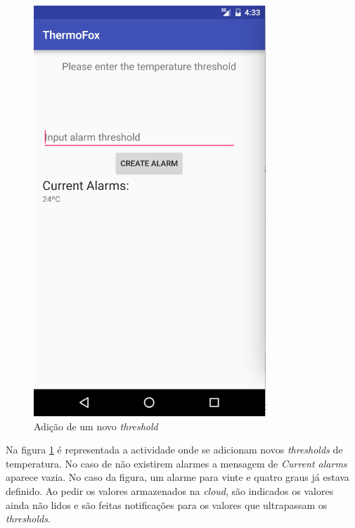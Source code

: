 \documentclass[a4paper]{article}
\begin{document}
\begin{figure}[H]
  \includegraphics[width=\linewidth]{addAlarm.png}
  \caption{Adição de um novo \textit{threshold}}\label{fig:addAlarm}
\endminipage
\end{figure}

Na figura \ref{fig:addAlarm} é representada a actividade onde se adicionam novos \textit{thresholds} de temperatura. No caso de não existirem alarmes a mensagem de \textit{Current alarms} aparece vazia. No caso da figura, um alarme para vinte e quatro graus já estava definido. Ao pedir os valores armazenados na \textit{cloud}, são indicados os valores ainda não lidos e são feitas notificações para os valores que ultrapassam os \textit{thresholds}.
\end{document}

